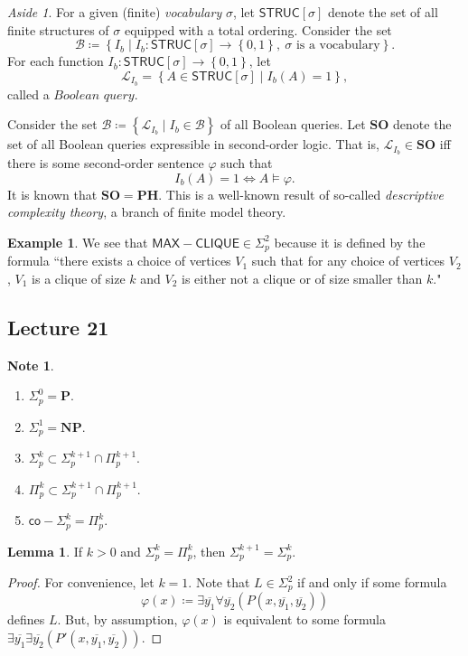 \documentclass[10pt,letterpaper,cm]{nupset}
\theoremstyle{definition}
\newtheorem{exmp}[definition]{Example}
\newtheorem{note}[definition]{Note}
\theoremstyle{theorem}
\newtheorem{lemma}[definition]{Lemma}
\theoremstyle{remark}
\newtheorem*{aside}{Aside}
\newcommand{\1}{\mathbf{1}}
\newcommand{\0}{\vec 0}
\begin{document}
\begin{aside}
For a given (finite) \textit{vocabulary} $\sigma$, let $\mathsf{STRUC}[\sigma]$ denote the set of all  finite structures of $\sigma$ equipped with a total ordering. Consider the set $$\mathcal{B} \coloneqq \left\{I_b \mid I_b :   \mathsf{STRUC}[\sigma] \to \left\{0,1\right\},\  \sigma \text{ is a vocabulary}\right\}.$$ For each  function $I_b :  \mathsf{STRUC}[\sigma] \to \left\{0,1\right\}$, let $$\mathcal{L}_{I_b} = \left\{A \in \mathsf{STRUC}[\sigma] \mid I_b(A) = 1\right\},$$ called a $\textit{Boolean query}$. 

Consider the set $\mathcal{B} \coloneqq \left\{ \mathcal{L}_{I_b} \mid I_b \in \mathcal{B}\right\}$ of all Boolean queries. Let $\mathbf{SO}$ denote the set of all Boolean queries expressible in second-order logic. That is, $\mathcal{L}_{I_b} \in \mathbf{SO}$ iff there is some second-order sentence $\varphi$ such that $$I_b(A) =1 \iff A \models \varphi.$$ It is known that $\mathbf{SO} = \mathbf{PH}$. This is a well-known result of so-called \textit{descriptive complexity theory}, a branch of finite model theory.
\end{aside}

\begin{exmp} 
We see that $\mathsf{MAX{-}CLIQUE} \in \Sigma^2_p$ because it is defined by the formula ``there exists a choice of vertices $V_1$ such that for any choice of vertices $V_2$, $V_1$ is a clique of size $k$ and $V_2$ is either not a clique or of size smaller than $k$."
\end{exmp}

\subsection{Lecture 21}

\begin{note} $ $
\begin{enumerate}
\item $\Sigma_p^0 = \mathbf{P}$.
\item $\Sigma_p^1 = \mathbf{NP} $.
\item $\Sigma^k_p \subset \Sigma^{k+1}_p \cap \Pi^{k+1}_p$.
\item $\Pi^k_p \subset \Sigma^{k+1}_p \cap \Pi^{k+1}_p$.
\item $\mathsf{co}{-}\Sigma^k_p = \Pi^k_p$. 
\end{enumerate}
\end{note}

\begin{lemma}
If $k>0$ and $\Sigma_p^k = \Pi^k_p$, then $\Sigma^{k+1}_p = \Sigma^k_p$.
\end{lemma}
\begin{proof}
For convenience, let $k=1$. Note that $L \in \Sigma^2_p$ if and only if some formula $$\varphi(x)\coloneqq \exists{\overline{y_1}}\forall{\overline{y_2}}(P(x, \overline{y_1}, \overline{y_2}))$$ defines $L$. But, by assumption, $\varphi(x)$ is equivalent to some formula  $ \exists{\overline{y_1}}\exists{\overline{y_2}}(P'(x, \overline{y_1}, \overline{y_2}))$.
\end{proof}
\end{document}
